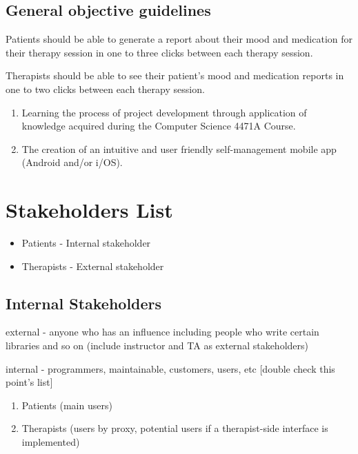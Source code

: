 \documentclass[11pt]{article}
\begin{document}
    \subsection{General objective guidelines}\label{subsec:general-objective-guidelines}
    Patients should be able to generate a report about their mood and medication for their therapy session in one to three clicks between each therapy session.

    Therapists should be able to see their patient's mood and medication reports in one to two clicks between each therapy session.

    \begin{enumerate}
        \item Learning the process of project development through application of knowledge acquired during the Computer Science 4471A Course.
        \item The creation of an intuitive and user friendly self-management mobile app (Android and/or i/OS).
    \end{enumerate}


    \section{Stakeholders List}\label{sec:stakeholders-list}
    \begin{itemize}
        \item Patients - Internal stakeholder
        \item Therapists - External stakeholder
    \end{itemize}

    \subsection{Internal Stakeholders}\label{subsec:internal-stakeholders}

    \item external - anyone who has an influence\; including people who write certain libraries and so on  (include instructor and TA as external stakeholders)
    \item internal - programmers, maintainable, customers, users, etc [double check this point's list]

    \begin{enumerate}
        \item Patients (main users)
        \item Therapists (users by proxy, potential users if a therapist-side interface is implemented)
    \end{enumerate}
\end{document}
